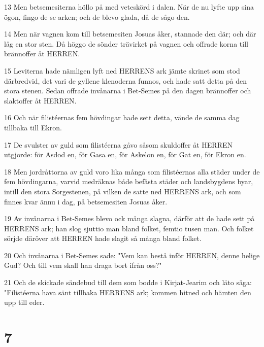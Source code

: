 \par 13 Men betsemesiterna höllo på med veteskörd i dalen. När de nu lyfte upp sina ögon, fingo de se arken; och de blevo glada, då de sågo den.
\par 14 Men när vagnen kom till betsemesiten Josuas åker, stannade den där; och där låg en stor sten. Då höggo de sönder trävirket på vagnen och offrade korna till brännoffer åt HERREN.
\par 15 Leviterna hade nämligen lyft ned HERRENS ark jämte skrinet som stod därbredvid, det vari de gyllene klenoderna funnos, och hade satt detta på den stora stenen. Sedan offrade invånarna i Bet-Semes på den dagen brännoffer och slaktoffer åt HERREN.
\par 16 Och när filistéernas fem hövdingar hade sett detta, vände de samma dag tillbaka till Ekron.
\par 17 De svulster av guld som filistéerna gåvo såsom skuldoffer åt HERREN utgjorde: för Asdod en, för Gasa en, för Askelon en, för Gat en, för Ekron en.
\par 18 Men jordråttorna av guld voro lika många som filistéernas alla städer under de fem hövdingarna, varvid medräknas både befästa städer och landsbygdens byar, intill den stora Sorgestenen, på vilken de satte ned HERRENS ark, och som finnes kvar ännu i dag, på betsemesiten Josuas åker.
\par 19 Av invånarna i Bet-Semes blevo ock många slagna, därför att de hade sett på HERRENS ark; han slog sjuttio man bland folket, femtio tusen man. Och folket sörjde däröver att HERREN hade slagit så många bland folket.
\par 20 Och invånarna i Bet-Semes sade: "Vem kan bestå inför HERREN, denne helige Gud? Och till vem skall han draga bort ifrån oss?"
\par 21 Och de skickade sändebud till dem som bodde i Kirjat-Jearim och läto säga: "Filistéerna hava sänt tillbaka HERRENS ark; kommen hitned och hämten den upp till eder.

\chapter{7}

